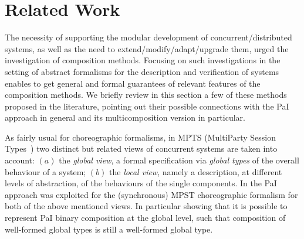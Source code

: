 

\section{Related Work}
\label{sect:related-work}

The necessity of supporting the modular development of concurrent/distributed systems,
as well as the need to extend/modify/adapt/upgrade them, urged the investigation
 of composition methods. Focusing on such investigations in the setting of abstract formalisms
for the description and verification of systems enables to get general and formal guarantees of relevant features of the composition methods.  
We briefly review in this section a few of these methods proposed in the literature,
pointing out their possible connections with the PaI approach in general and its multicomposition
version in particular. 

\smallskip

As fairly usual for choreographic formalisms, in MPTS 
 (MultiParty Session Types~\cite{HYC08,Honda2016})
two distinct but related views of concurrent systems are taken into account:
$(a)$ the {\em global view}, a formal specification via {\em global types} of the overall behaviour 
of a system; $(b)$ the {\em local view}, namely a description, at different  levels 
of abstraction, of the behaviours of the single components. 
In \cite{BDLT21} the PaI approach was exploited for the (synchronous) MPST choreographic formalism
for both of the above mentioned views. In particular showing that it is possible to represent 
PaI binary composition at the global level, such that composition of well-formed global types
is still a well-formed global type. 

